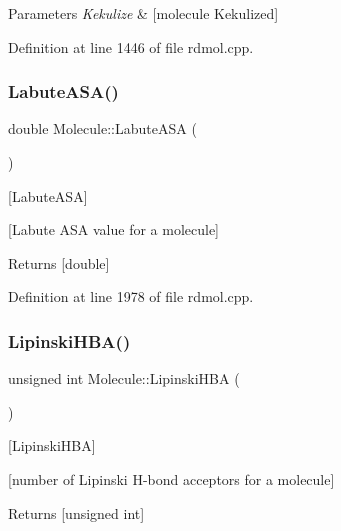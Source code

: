 \begin{DoxyParams}{Parameters}
{\em Kekulize} & \mbox{[}molecule Kekulized\mbox{]} \\
\hline
\end{DoxyParams}


Definition at line 1446 of file rdmol.\+cpp.

\mbox{\label{class_molecule_a3ed0d0c3a496259b3e030dcfc2e37e39}} 
\subsubsection{\texorpdfstring{Labute\+A\+S\+A()}{LabuteASA()}}
{\footnotesize\ttfamily double Molecule\+::\+Labute\+A\+SA (\begin{DoxyParamCaption}{ }\end{DoxyParamCaption})}



\mbox{[}Labute\+A\+SA\mbox{]} 

\mbox{[}Labute A\+SA value for a molecule\mbox{]}

\begin{DoxyReturn}{Returns}
\mbox{[}double\mbox{]} 
\end{DoxyReturn}


Definition at line 1978 of file rdmol.\+cpp.

\mbox{\label{class_molecule_aae854241373a2539a0b9421b8d295dd6}} 
\subsubsection{\texorpdfstring{Lipinski\+H\+B\+A()}{LipinskiHBA()}}
{\footnotesize\ttfamily unsigned int Molecule\+::\+Lipinski\+H\+BA (\begin{DoxyParamCaption}{ }\end{DoxyParamCaption})}



\mbox{[}Lipinski\+H\+BA\mbox{]} 

\mbox{[}number of Lipinski H-\/bond acceptors for a molecule\mbox{]}

\begin{DoxyReturn}{Returns}
\mbox{[}unsigned int\mbox{]} 
\end{DoxyReturn}



